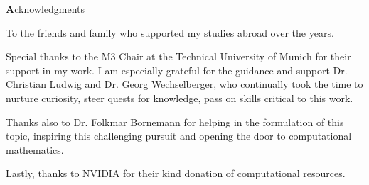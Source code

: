 \clearemptydoublepage
{}
{}



\vspace*{2cm}

\begin{center}
{\Large \textbf Acknowledgments}
\end{center}

\vspace{1cm}



\begin{center}
To the friends and family who supported my studies abroad over the years.
\newline
\newline

Special thanks to the M3 Chair at the Technical University of Munich for their support in my work.
I am especially grateful for the guidance and support Dr. Christian Ludwig and Dr. Georg Wechselberger,
who continually took the time to nurture curiosity, steer quests for knowledge,
pass on skills critical to this work.
\newline
\newline

Thanks also to Dr. Folkmar Bornemann for helping in the formulation of this topic,
inspiring this challenging pursuit and opening the door to computational mathematics.
\newline
\newline
\newline

Lastly, thanks to NVIDIA for their kind donation of computational resources.
\end{center}
